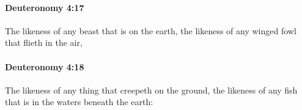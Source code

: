 		\paragraph{Deuteronomy 4:17} %
			\label{DEUTERONOMY-4-17}

			The likeness of any beast that is on the earth, the likeness of any winged fowl that flieth in the air,


		\paragraph{Deuteronomy 4:18} %
			\label{DEUTERONOMY-4-18}

			The likeness of any thing that creepeth on the ground, the likeness of any fish that is in the waters beneath the earth:


